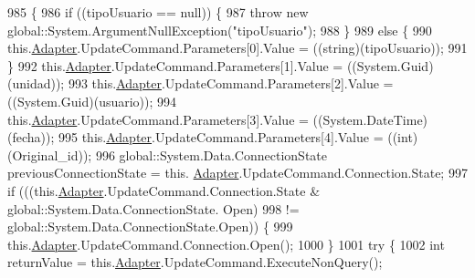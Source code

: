 \begin{DoxyCode}
985                                                                                                            
                                  \{
986             \textcolor{keywordflow}{if} ((tipoUsuario == null)) \{
987                 \textcolor{keywordflow}{throw} \textcolor{keyword}{new} global::System.ArgumentNullException(\textcolor{stringliteral}{"tipoUsuario"});
988             \}
989             \textcolor{keywordflow}{else} \{
990                 this.\hyperlink{class_proyecto___integrador__3_1_1ds_servicios_table_adapters_1_1_servicios_table_adapter_a6e2d84a1b2c925ab5f078c403b1e3ecf}{Adapter}.UpdateCommand.Parameters[0].Value = ((string)(tipoUsuario));
991             \}
992             this.\hyperlink{class_proyecto___integrador__3_1_1ds_servicios_table_adapters_1_1_servicios_table_adapter_a6e2d84a1b2c925ab5f078c403b1e3ecf}{Adapter}.UpdateCommand.Parameters[1].Value = ((System.Guid)(unidad));
993             this.\hyperlink{class_proyecto___integrador__3_1_1ds_servicios_table_adapters_1_1_servicios_table_adapter_a6e2d84a1b2c925ab5f078c403b1e3ecf}{Adapter}.UpdateCommand.Parameters[2].Value = ((System.Guid)(usuario));
994             this.\hyperlink{class_proyecto___integrador__3_1_1ds_servicios_table_adapters_1_1_servicios_table_adapter_a6e2d84a1b2c925ab5f078c403b1e3ecf}{Adapter}.UpdateCommand.Parameters[3].Value = ((System.DateTime)(fecha));
995             this.\hyperlink{class_proyecto___integrador__3_1_1ds_servicios_table_adapters_1_1_servicios_table_adapter_a6e2d84a1b2c925ab5f078c403b1e3ecf}{Adapter}.UpdateCommand.Parameters[4].Value = ((int)(Original\_id));
996             global::System.Data.ConnectionState previousConnectionState = this.
      \hyperlink{class_proyecto___integrador__3_1_1ds_servicios_table_adapters_1_1_servicios_table_adapter_a6e2d84a1b2c925ab5f078c403b1e3ecf}{Adapter}.UpdateCommand.Connection.State;
997             \textcolor{keywordflow}{if} (((this.\hyperlink{class_proyecto___integrador__3_1_1ds_servicios_table_adapters_1_1_servicios_table_adapter_a6e2d84a1b2c925ab5f078c403b1e3ecf}{Adapter}.UpdateCommand.Connection.State & global::System.Data.ConnectionState.
      Open) 
998                         != global::System.Data.ConnectionState.Open)) \{
999                 this.\hyperlink{class_proyecto___integrador__3_1_1ds_servicios_table_adapters_1_1_servicios_table_adapter_a6e2d84a1b2c925ab5f078c403b1e3ecf}{Adapter}.UpdateCommand.Connection.Open();
1000             \}
1001             \textcolor{keywordflow}{try} \{
1002                 \textcolor{keywordtype}{int} returnValue = this.\hyperlink{class_proyecto___integrador__3_1_1ds_servicios_table_adapters_1_1_servicios_table_adapter_a6e2d84a1b2c925ab5f078c403b1e3ecf}{Adapter}.UpdateCommand.ExecuteNonQuery();

\end{DoxyCode}
